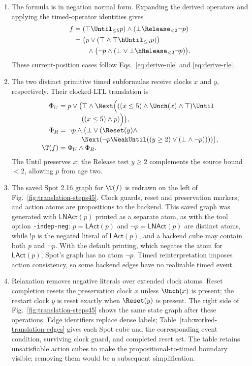 \begin{enumerate}[label=Step~\arabic*:,leftmargin=*]
\item The formula is in negation normal form. Expanding the derived operators
and applying the timed-operator identities gives
\[
\begin{aligned}
f
 &= (\top\Until_{\le5}p)\land(\bot\Release_{<2}\neg p)\\
 &= \bigl(p\lor(\top\land\top\hUntil_{\le5}p)\bigr)\\
 &\qquad\land\bigl(\neg p\land(\bot\lor\bot\hRelease_{<2}\neg p)\bigr).
\end{aligned}
\]
These current-position cases follow Eqs.~\eqref{eq:derive-ule} and
\eqref{eq:derive-rle}.

\item The two distinct primitive timed subformulas receive clocks $x$ and
$y$, respectively. Their clocked-LTL translation is
\begin{align*}
\Phi_U={}&p\lor\bigl(\top\land\Next\Bigl(
  ((x\le5)\land\Unch(x)\land\top)\Until\\[-1mm]
&\qquad((x\le5)\land p)\Bigr)\bigr),\\[-1mm]
\Phi_R={}&\neg p\land\bigl(\bot\lor(\Reset(y)\land\\[-1mm]
&\qquad\Next(\neg p\WeakUntil((y\ge2)\lor(\bot\land\neg p))))\bigr),\\[-1mm]
\T(f)={}&\Phi_U\land\Phi_R.
\end{align*}
The Until preserves $x$; the Release test $y\ge2$ complements the source
bound $<2$, allowing $p$ from age two.

\item The saved Spot 2.16 graph for $\T(f)$ is redrawn on the left of
Fig.~\ref{fig:translation-steps45}. Clock guards, reset and preservation
markers, and action atoms are propositions to the backend. This saved graph
was generated with $\mathsf{LNAct}(p)$ printed as a separate atom, as with the
tool option \texttt{-indep-neg}: $p=\mathsf{LAct}(p)$ and
$\neg p=\mathsf{LNAct}(p)$ are distinct atoms, while $!p$ is the negated
literal of $\mathsf{LAct}(p)$, and a backend cube may contain both $p$ and
$\neg p$. With the default printing, which negates the atom for
$\mathsf{LAct}(p)$, Spot's graph has no atom $\neg p$. Timed reinterpretation imposes action
consistency, so some backend edges have no realizable timed event.

\item Relaxation removes negative literals over extended clock atoms. Reset
completion resets the preservation clock $x$ unless $\Unch(x)$ is present;
the restart clock $y$ is reset exactly when $\Reset(y)$ is present. The right
side of Fig.~\ref{fig:translation-steps45} shows the same state graph after
these operations. Edge identifiers replace dense labels; Table~\ref{tab:worked-translation-edges}
gives each Spot cube and the corresponding event condition, surviving clock
guard, and completed reset set. The table retains unsatisfiable action cubes
to make the propositional-to-timed boundary visible; removing them would be a
subsequent simplification.
\end{enumerate}

